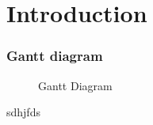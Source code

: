 \documentclass[12pt]{article}
\begin{document}
\section{Introduction}	


\subsubsection{Gantt diagram}
\clearpage

\thispagestyle{empty}
\begin{figure}[htb]
\begin{center}
\end{center}
\end{figure}
\clearpage

\thispagestyle{empty}
\begin{figure}[htb]
\begin{center}
\end{center}
\caption{Gantt Diagram}
\end{figure}
\clearpage












\clearpage
sdhjfds
\end{document}

